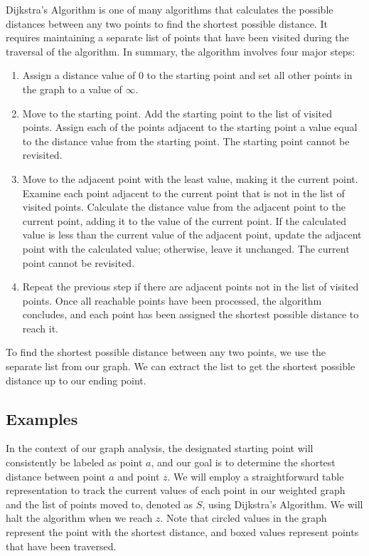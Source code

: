 \documentclass{article}
\begin{document}
        Dijkstra's Algorithm is one of many algorithms that calculates the possible distances between any two points to find the shortest possible distance. It requires maintaining a separate list of points that have been visited during the traversal of the algorithm. In summary, the algorithm involves four major steps:
        \begin{enumerate}
            \item Assign a distance value of 0 to the starting point and set all other points in the graph to a value of $\infty$. 
            \item Move to the starting point. Add the starting point to the list of visited points. Assign each of the points adjacent to the starting point a value equal to the distance value from the starting point. The starting point cannot be revisited.
            \item Move to the adjacent point with the least value, making it the current point. Examine each point adjacent to the current point that is not in the list of visited points. Calculate the distance value from the adjacent point to the current point, adding it to the value of the current point. If the calculated value is less than the current value of the adjacent point, update the adjacent point with the calculated value; otherwise, leave it unchanged. The current point cannot be revisited.
            \item Repeat the previous step if there are adjacent points not in the list of visited points. Once all reachable points have been processed, the algorithm concludes, and each point has been assigned the shortest possible distance to reach it.
        \end{enumerate}
        To find the shortest possible distance between any two points, we use the separate list from our graph. We can extract the list to get the shortest possible distance up to our ending point.

\newpage

    \subsection{Examples}
    
        In the context of our graph analysis, the designated starting point will consistently be labeled as point $a$, and our goal is to determine the shortest distance between point $a$ and point $z$. We will employ a straightforward table representation to track the current values of each point in our weighted graph and the list of points moved to, denoted as $S$, using Dijkstra's Algorithm. We will halt the algorithm when we reach $z$. Note that circled values in the graph represent the point with the shortest distance, and boxed values represent points that have been traversed.
\end{document}
